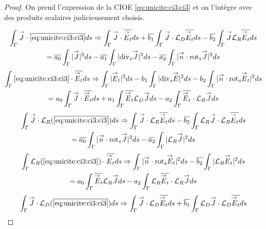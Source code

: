   \begin{proof}
    On prend l'expression de la CIOE \eqref{eq:unicite:ci3:ci3} et on l’intègre avec des produits scalaires judicieusement choisis.

    \begin{multline}
      \label{eq:unicite:ci3:csu3-1}
      \int_\Gamma \vJ\cdot\conj{\eqref{eq:unicite:ci3:ci3}}ds \Rightarrow
      \int_\Gamma \vJ \cdot \conj{\vE_t} ds  + \conj{b_1} \int_\Gamma \vJ\cdot \LD\conj{\vE_t} ds - \conj{b_2} \int_\Gamma \vJ \LR\conj{\vE_t} ds \\
      = \conj{a_0} \int_\Gamma |\vJ|^2ds - \conj{a_1} \int_\Gamma |\tdivs \vJ|^2 ds - \conj{a_2} \int_\Gamma |\vn \cdot \trots \vJ|^2 ds
    \end{multline}
    \begin{multline}
      \label{eq:unicite:ci3:csu3-2}
      \int_\Gamma \eqref{eq:unicite:ci3:ci3} \cdot \conj{\vE_t} ds \Rightarrow
      \int_\Gamma |\vE_t|^2 ds  - b_1 \int_\Gamma | \tdivs \vE |^2 ds - b_2 \int_\Gamma | \vn \cdot \trots \vE_t|^2 ds \\
      = a_0 \int_\Gamma \vJ\cdot \conj{\vE_t}ds + a_1 \int_\Gamma \conj{\vE_t} \LD \vJ ds - a_2 \int_\Gamma \conj{\vE_t} \cdot \LR \vJ ds
    \end{multline}
    \begin{multline}
      \label{eq:unicite:ci3:csu3-3}
      \int_\Gamma \vJ \cdot \LR ( \conj{\eqref{eq:unicite:ci3:ci3}} ) ds \Rightarrow
      \int_\Gamma \vJ \cdot \LR \conj{\vE_t} ds  - \conj{b_2} \int_\Gamma \LR \vJ \cdot \LR \conj{\vE_t} ds \\
      =  \conj{a_0} \int_\Gamma |\vn \cdot \trots \vJ|^2ds - \conj{a_2} \int_\Gamma | \LR \vJ|^2 ds
    \end{multline}
    \begin{multline}
      \label{eq:unicite:ci3:csu3-4}
      \int_\Gamma  \LR ( \eqref{eq:unicite:ci3:ci3} ) \cdot \conj{\vE_t} ds \Rightarrow
      \int_\Gamma | \vn \cdot \trots \vE_t |^2 ds  - \conj{b_2} \int_\Gamma | \LR \vE_t|^2 ds \\
      = a_0 \int_\Gamma \conj{\vE_t} \LR \vJ ds - a_2 \int_\Gamma \LR \conj{\vE_t} \cdot \LR \vJ ds
    \end{multline}
      \begin{multline}
      \label{eq:unicite:ci3:csu3-5}
      \int_\Gamma \vJ \cdot \LD ( \conj{\eqref{eq:unicite:ci3:ci3}} ) ds \Rightarrow
      \int_\Gamma \vJ \cdot \LD \conj{\vE_t} ds  + \conj{b_1} \int_\Gamma \LD \vJ \cdot \LD \conj{\vE_t} ds \\

\end{multline}
\end{proof}
